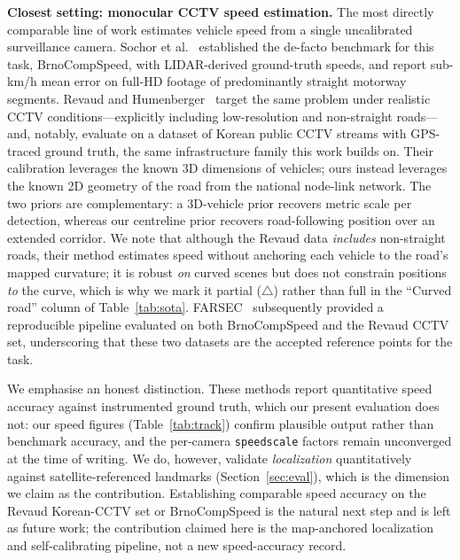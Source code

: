 \documentclass[conference]{IEEEtran}
\renewcommand{\_}{\textunderscore\allowbreak}
\begin{document}
\textbf{Closest setting: monocular CCTV speed estimation.}
The most directly comparable line of work estimates vehicle speed from a single
uncalibrated surveillance camera. Sochor et al.~\cite{sochor2019} established the
de-facto benchmark for this task, BrnoCompSpeed, with LIDAR-derived ground-truth
speeds, and report sub-km/h mean error on full-HD footage of predominantly
straight motorway segments. Revaud and Humenberger~\cite{revaud2021} target the
same problem under realistic CCTV conditions---explicitly including low-resolution
and non-straight roads---and, notably, evaluate on a dataset of Korean public CCTV
streams with GPS-traced ground truth, the same infrastructure family this work
builds on. Their calibration leverages the known 3D dimensions of vehicles;
ours instead leverages the known 2D geometry of the road from the national
node-link network. The two priors are complementary: a 3D-vehicle prior recovers
metric scale per detection, whereas our centreline prior recovers road-following
position over an extended corridor. We note that although the Revaud data
\emph{includes} non-straight roads, their method estimates speed without anchoring
each vehicle to the road's mapped curvature; it is robust \emph{on} curved scenes
but does not constrain positions \emph{to} the curve, which is why we mark it
partial ($\triangle$) rather than full in the ``Curved road'' column of
Table~\ref{tab:sota}. FARSEC~\cite{farsec2023} subsequently provided
a reproducible pipeline evaluated on both BrnoCompSpeed and the Revaud CCTV set,
underscoring that these two datasets are the accepted reference points for the
task.

We emphasise an honest distinction. These methods report quantitative speed
accuracy against instrumented ground truth, which our present evaluation does not:
our speed figures (Table~\ref{tab:track}) confirm plausible output rather than
benchmark accuracy, and the per-camera \texttt{speed\_scale} factors remain
unconverged at the time of writing. We do, however, validate \emph{localization}
quantitatively against satellite-referenced landmarks (Section~\ref{sec:eval}),
which is the dimension we claim as the contribution. Establishing comparable speed
accuracy on the Revaud Korean-CCTV set or BrnoCompSpeed is the natural next step and
is left as future work; the contribution claimed here is the map-anchored
localization and self-calibrating pipeline, not a new speed-accuracy record.
\end{document}
